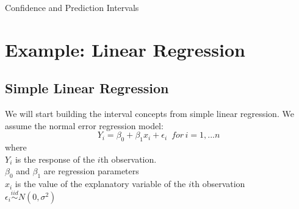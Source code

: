 \documentclass[12pt]{pom_thesis}
\newtheorem{definition}{Definition}[section]
\begin{document}
\begin{chapter}{Confidence and Prediction Intervals}



\section{Example: Linear Regression}
\subsection{Simple Linear Regression}
We will start building the interval concepts from simple linear regression. We assume the normal error regression model:
\begin{equation}
    Y_i = \beta_0 +\beta_1 x_i +\epsilon_i \,\,\, for\, i = 1,...n
\end{equation}
where \\
$Y_i$ is the response of the $i$th observation.\\
$\beta_0$ and $\beta_1$ are regression parameters\\
$x_i$ is the value of the explanatory variable of the $i$th observation \\
$\epsilon_i \stackrel{iid}{\sim} N(0,\sigma^2)$ 


\end{chapter}
\end{document}
